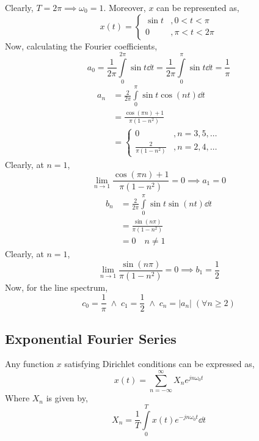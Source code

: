 		\begin{explanation}
			Clearly, $T=2\pi \implies \omega_0=1$. Moreover, $x$ can be represented as,
			\[x(t)=\begin{cases}
				\sin t &, 0<t<\pi\\
				0 &, \pi <t < 2\pi
			\end{cases}\]
			Now, calculating the Fourier coefficients,
			\[a_0=\frac{1}{2\pi}\int\limits_0^{2\pi}\sin t\dd{t}=\frac{1}{2\pi}\int\limits_0^{\pi}\sin t\dd{t}=\frac{1}{\pi}\]
			\[\begin{split}
				a_n&=\frac{2}{2\pi}\int\limits_0^{\pi}\sin t\cos(nt)\dd{t}\\
				&=\frac{\cos(\pi n)+1}{\pi(1-n^2)}\\
				&=\begin{cases}
					0 &, n=3,5,\ldots\\
					\frac{2}{\pi (1-n^2)} &, n=2,4,\ldots
				\end{cases}
			\end{split}\]
			Clearly, at $n=1$,
			\[\lim\limits_{n\to 1}\frac{\cos(\pi n)+1}{\pi(1-n^2)}=0\implies a_1=0\]
			\[\begin{split}
				b_n&=\frac{2}{2\pi}\int\limits_0^{\pi}\sin t\sin(nt)\dd{t}\\
				&=\frac{\sin(n\pi)}{\pi(1-n^2)}\\
				&=0 \quad n\neq1
			\end{split}\]
			Clearly, at $n=1$,
			\[\lim\limits_{n\to 1}\frac{\sin(n\pi)}{\pi(1-n^2)}=0\implies b_1=\frac{1}{2}\]
			Now, for the line spectrum,
			\[c_0=\frac{1}{\pi} \; \land \; c_1=\frac{1}{2} \; \land \; c_n=|a_n| \; (\forall n\geq 2)\]
		\end{explanation}
		\subsection{Exponential Fourier Series}
		Any function $x$ satisfying Dirichlet conditions can be expressed as,
		\[x(t)=\sum\limits_{n=-\infty}^\infty X_n e^{jn\omega_0t}\]
		Where $X_n$ is given by,
		\[X_n=\frac{1}{T}\int\limits_0^T x(t)e^{-jn\omega_0t}\dd{t}\]
